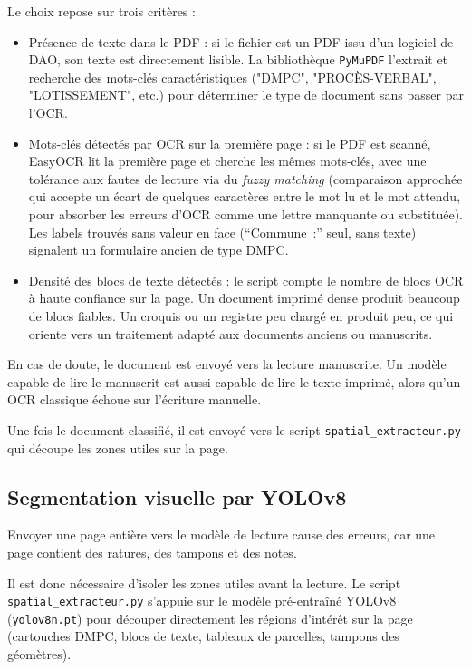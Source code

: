 Le choix repose sur trois critères :

\begin{itemize}
  \item Présence de texte dans le PDF : si le fichier est un PDF issu d'un logiciel de DAO, son texte est directement lisible. La bibliothèque \texttt{PyMuPDF} l'extrait et recherche des mots-clés caractéristiques ("DMPC", "PROCÈS-VERBAL", "LOTISSEMENT", etc.) pour déterminer le type de document sans passer par l'OCR.

  \item Mots-clés détectés par OCR sur la première page : si le PDF est scanné, EasyOCR lit la première page et cherche les mêmes mots-clés, avec une tolérance aux fautes de lecture via du \textit{fuzzy matching} (comparaison approchée qui accepte un écart de quelques caractères entre le mot lu et le mot attendu, pour absorber les erreurs d'OCR comme une lettre manquante ou substituée). Les labels trouvés sans valeur en face (``Commune~:'' seul, sans texte) signalent un formulaire ancien de type DMPC.

  \item Densité des blocs de texte détectés : le script compte le nombre de blocs OCR à haute confiance sur la page. Un document imprimé dense produit beaucoup de blocs fiables. Un croquis ou un registre peu chargé en produit peu, ce qui oriente vers un traitement adapté aux documents anciens ou manuscrits.
\end{itemize}

En cas de doute, le document est envoyé vers la lecture manuscrite. Un modèle capable de lire le manuscrit est aussi capable de lire le texte imprimé, alors qu'un OCR classique échoue sur l'écriture manuelle.

Une fois le document classifié, il est envoyé vers le script \texttt{spatial\allowbreak\_extracteur\allowbreak.py} qui découpe les zones utiles sur la page.

\subsection{Segmentation visuelle par YOLOv8}

Envoyer une page entière vers le modèle de lecture cause des erreurs, car une page contient des ratures, des tampons et des notes.

Il est donc nécessaire d'isoler les zones utiles avant la lecture. Le script \texttt{spatial\allowbreak\_extracteur\allowbreak.py} s'appuie sur le modèle pré-entraîné YOLOv8 (\texttt{yolov8n.pt}) pour découper directement les régions d'intérêt sur la page (cartouches DMPC, blocs de texte, tableaux de parcelles, tampons des géomètres).


